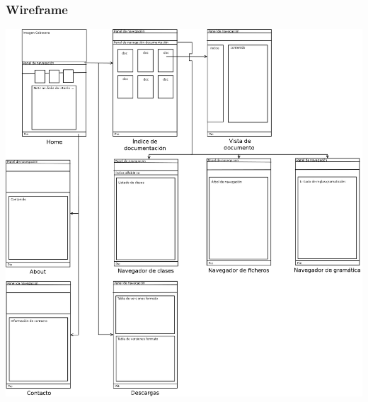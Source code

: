 \subsubsection{Wireframe}
\begin{center}
\includegraphics[scale=0.3]{wireframe.png} \\
\end{center}
